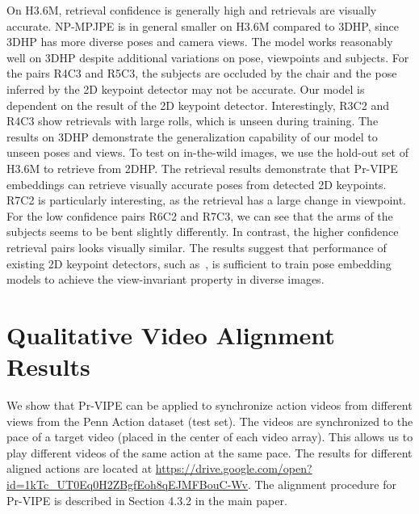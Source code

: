 On H3.6M, retrieval confidence is generally high and retrievals are visually accurate. NP-MPJPE is in general smaller on H3.6M compared to 3DHP, since 3DHP has more diverse poses and camera views. The model works reasonably well on 3DHP despite additional variations on pose, viewpoints and subjects. For the pairs R4C3 and R5C3, the subjects are occluded by the chair and the pose inferred by the 2D keypoint detector may not be accurate. Our model is dependent on the result of the 2D keypoint detector. Interestingly, R3C2 and R4C3 show retrievals with large rolls, which is unseen during training. The results on 3DHP demonstrate the generalization capability of our model to unseen poses and views. To test on in-the-wild images, we use the hold-out set of H3.6M to retrieve from 2DHP. The retrieval results demonstrate that Pr-VIPE embeddings can retrieve visually accurate poses from detected 2D keypoints. R7C2 is particularly interesting, as the retrieval has a large change in viewpoint. For the low confidence pairs R6C2 and R7C3, we can see that the arms of the subjects seems to be bent slightly differently. In contrast, the higher confidence retrieval pairs looks visually similar. The results suggest that performance of existing 2D keypoint detectors, such as~\cite{papandreou2018personlab}, is sufficient to train pose embedding models to achieve the view-invariant property in diverse images.

\section{Qualitative Video Alignment Results}\label{sec:video_alignment_qres}

We show that Pr-VIPE can be applied to synchronize action videos from different views from the Penn Action dataset (test set). The videos are synchronized to the pace of a target video (placed in the center of each video array). This allows us to play different videos of the same action at the same pace. The results for different aligned actions are located at \url{https://drive.google.com/open?id=1kTc_UT0Eq0H2ZBgfEoh8qEJMFBouC-Wv}. The alignment procedure for Pr-VIPE is described in Section 4.3.2 in the main paper.

